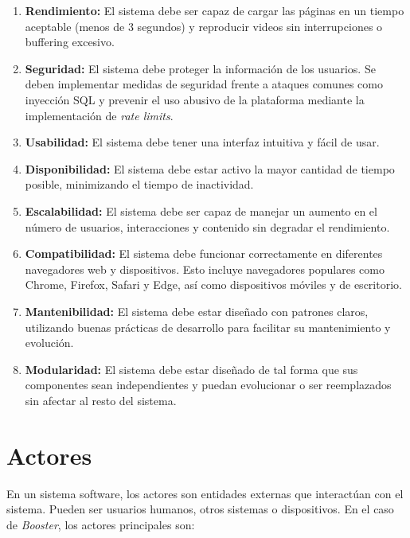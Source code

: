\begin{enumerate}[label=\textbf{RNF \arabic*.}, leftmargin=*]
    \item \textbf{Rendimiento: } El sistema debe ser capaz de cargar las páginas en un tiempo aceptable (menos de 3 segundos) y reproducir videos sin interrupciones o buffering excesivo.
    \item \textbf{Seguridad:} El sistema debe proteger la información de los usuarios. Se deben implementar medidas de seguridad frente a ataques comunes como inyección SQL y prevenir el uso abusivo de la plataforma mediante la implementación de \textit{rate limits}.
    \item \textbf{Usabilidad:} El sistema debe tener una interfaz intuitiva y fácil de usar. 
    \item \textbf{Disponibilidad:} El sistema debe estar activo la mayor cantidad de tiempo posible, minimizando el tiempo de inactividad.
    \item \textbf{Escalabilidad: } El sistema debe ser capaz de manejar un aumento en el número de usuarios, interacciones y contenido sin degradar el rendimiento.
    \item \textbf{Compatibilidad: } El sistema debe funcionar correctamente en diferentes navegadores web y dispositivos. Esto incluye navegadores populares como Chrome, Firefox, Safari y Edge, así como dispositivos móviles y de escritorio.
    \item \textbf{Mantenibilidad: } El sistema debe estar diseñado con patrones claros, utilizando buenas prácticas de desarrollo para facilitar su mantenimiento y evolución.
    \item \textbf{Modularidad: } El sistema debe estar diseñado de tal forma que sus componentes sean independientes y puedan evolucionar o ser reemplazados sin afectar al resto del sistema. 
\end{enumerate}

\section{Actores}

En un sistema software, los actores son entidades externas que interactúan con el sistema. Pueden ser usuarios humanos, otros sistemas o dispositivos. En el caso de \textit{Booster}, los actores principales son:


